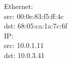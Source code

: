 Ethernet:\\
    src: 00:0e:83:f5:ff:4c\\
    dst: 68:05:ca:1a:7c:6f\\

IP:\\
    src: 10.0.1.11\\
    dst: 10.0.3.41

